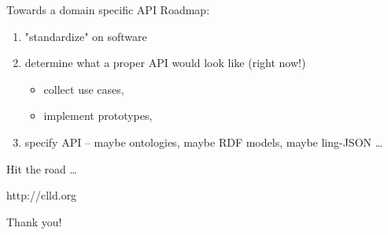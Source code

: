 \documentclass{beamer}
\begin{document}
\begin{frame}{Towards a domain specific API}
Roadmap:

\begin{enumerate}
\item "standardize" on software
\item determine what a proper API would look like (right now!)
\begin{itemize}
\item collect use cases,
\item implement prototypes,
\end{itemize}
\item specify API -- maybe ontologies, maybe RDF models, maybe ling-JSON \dots
\end{enumerate}
\end{frame}



\begin{frame}{Hit the road \dots}
\begin{center}
http://clld.org
\end{center}
\vskip 0.5cm
\begin{center}
Thank you!
\end{center}
\end{frame}
\end{document}
